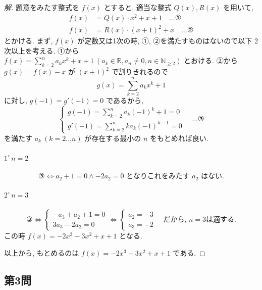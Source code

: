 \documentclass[../main.tex]{subfiles}
\begin{document}
\begin{proof}[解]
  題意をみたす整式を $f(x)$ とすると, 適当な整式 $Q(x), R(x)$ を用いて,
  \begin{align}
    f(x) &= Q(x) \cdot x^2 + x + 1 \quad \dots \text{①} \\
    f(x) &= R(x) \cdot (x+1)^2 + x \quad \dots \text{②}
  \end{align}
  とかける. まず, $f(x)$ が定数又は1次の時, ①, ②を満たすものはないので以下 2次以上を考える.
  ①から $f(x) = \sum_{k=2}^n a_k x^k + x + 1 \ (a_k \in \mathbb{R}, a_n \neq 0, n \in \mathbb{N}_{\ge 2})$ とおける.
  ②から $g(x) = f(x) - x$ が $(x+1)^2$ で割りきれるので
  \[ g(x) = \sum_{k=2}^n a_k x^k + 1 \]
  に対し, $g(-1) = g'(-1) = 0$ であるから,
  \begin{equation}
    \begin{cases}
      g(-1) = \sum_{k=2}^n a_k (-1)^k + 1 = 0 \\
      g'(-1) = \sum_{k=2}^n k a_k (-1)^{k-1} = 0
    \end{cases} \quad \dots \text{③}
  \end{equation}
  を満たす $a_k \ (k=2 \dots n)$ が存在する最小の $n$ をもとめれば良い.

  \paragraph{$1^\circ \, n=2$}
  \[ \text{③} \iff a_2 + 1 = 0 \land -2a_2 = 0 \text{ となりこれをみたす } a_2 \text{ はない.} \]

  \paragraph{$2^\circ \, n=3$}
  \[ \text{③} \iff
    \begin{cases} -a_3 + a_2 + 1 = 0 \\ 3a_3 - 2a_2 = 0
    \end{cases} \iff
    \begin{cases} a_2 = -3 \\ a_3 = -2
  \end{cases} \quad \text{だから, } n=3 \text{は適する.} \]
  この時 $f(x) = -2x^3 - 3x^2 + x + 1$ となる.

  以上から, もとめるのは $f(x) = -2x^3 - 3x^2 + x + 1$ である.
\end{proof}

\newpage

\subsection*{第3問}
\end{document}
